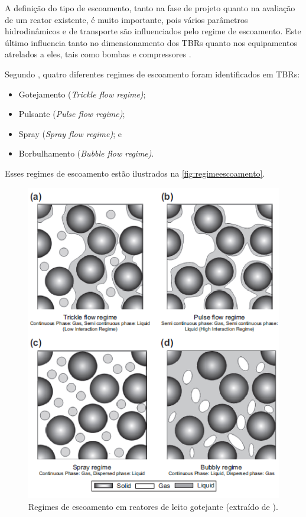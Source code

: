 A definição do tipo de escoamento, tanto na fase de projeto quanto na avaliação
de um reator existente, é muito importante, pois vários parâmetros
hidrodinâmicos e de transporte são influenciados pelo regime de escoamento. Este
último influencia tanto no dimensionamento dos TBRs quanto nos
equipamentos atrelados a eles, tais como bombas e compressores
\cite{Ranade2011}.

Segundo , quatro
diferentes regimes de escoamento foram identificados em TBRs:

\begin{itemize}
	\item Gotejamento (\emph{Trickle flow regime)};
	\item Pulsante (\emph{Pulse flow regime)};
	\item Spray (\emph{Spray flow regime)}; e
	\item Borbulhamento (\emph{Bubble flow regime)}.
\end{itemize}

Esses regimes de escoamento estão ilustrados na \autoref{fig:regimeescoamento}.

\begin{figure}[htb]
\centering \includegraphics[scale=0.75]{images/Chap2/regimeescoamento.png}
\caption{Regimes de escoamento em reatores de leito gotejante
\cite{Gunjal2005} (extraído de ).}
\label{fig:regimeescoamento}
\end{figure}

